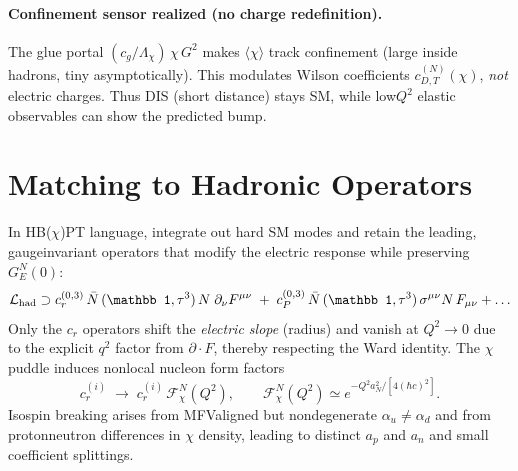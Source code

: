 \documentclass[11pt]{article}
\newcommand{\hc}{\hbar c}
\newcommand{\GE}{G_E}
\newcommand{\Lag}{\mathcal{L}}
\begin{document}
\paragraph{Confinement sensor realized (no charge redefinition).} The glue portal $(c_g/\Lambda_\chi)\,\chi\,G^2$ makes $\langle\chi\rangle$ track confinement (large inside hadrons, tiny asymptotically). This modulates Wilson coefficients $c_{D,T}^{(N)}(\chi)$, \emph{not} electric charges. Thus DIS (short distance) stays SM, while low\mbox{$Q^2$} elastic observables can show the predicted bump.

\section{Matching to Hadronic Operators}
In HB($\chi$)PT language, integrate out hard SM modes and retain the leading, gauge\mbox{\textendash}invariant operators that modify the electric response while preserving $\GE^N(0)$:
\begin{equation}
\Lag_{\rm had} \supset c_r^{(0,3)}\,\bar N\,(\mathbb 1,\tau^3)\,N\;\partial_\nu F^{\mu\nu}
\; +\; c_P^{(0,3)}\,\bar N\,(\mathbb 1,\tau^3)\,\sigma^{\mu\nu}N\,F_{\mu\nu}+\ldots
\end{equation}
Only the $c_r$ operators shift the \emph{electric slope} (radius) and vanish at $Q^2\to0$ due to the explicit $q^2$ factor from $\partial\!\cdot\!F$, thereby respecting the Ward identity. The $\chi$ puddle induces non\mbox{\textendash}local nucleon form factors
\begin{equation}
 c_r^{(i)} \;\to\; c_r^{(i)}\,\mathcal F_\chi^N(Q^2),\qquad \mathcal F_\chi^N(Q^2)\simeq e^{-Q^2 a_N^2/[4(\hc)^2]}.
\end{equation}
Isospin breaking arises from MFV\mbox{\textendash}aligned but non\mbox{\textendash}degenerate $\alpha_u\neq\alpha_d$ and from proton\mbox{\textendash}neutron differences in $\chi$ density, leading to distinct $a_p$ and $a_n$ and small coefficient splittings.
\end{document}
